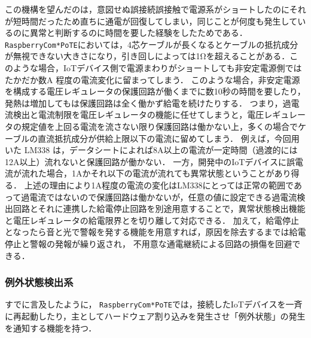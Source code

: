 この機構を望んだのは，意図せぬ誤接続誤接触で電源系がショートしたのにそれが短時間だったため直ちに通電が回復してしまい，同じことが何度も発生しているのに異常と判断するのに時間を要した経験をしたためである．
{\tt Raspberry\-Com*PoTE}においては，4芯ケーブルが長くなるとケーブルの抵抗成分が無視できない大きさになり，引き回しによっては1Ωを超えることがある．このような場合，IoTデバイス側で電源まわりがショートしても非安定電源側ではたかだか数A
程度の電流変化に留まってしまう．
このような場合，非安定電源を構成する電圧レギュレータの保護回路が働くまでに数10秒の時間を要したり，発熱は増加してもは保護回路は全く働かず給電を続けたりする．
つまり，過電流検出と電流制限を電圧レギュレータの機能に任せてしまうと，電圧レギュレータの規定値を上回る電流を流さない限り保護回路は働かない上，多くの場合でケーブルの直流抵抗成分が供給上限以下の電流に留めてしまう．
例えば，今回用いた LM338 は，データシートによれば8A以上の電流が一定時間（過渡的には12A以上）流れないと保護回路が働かない．
一方，開発中のIoTデバイスに誤電流が流れた場合，1Aかそれ以下の電流が流れても異常状態ということがあり得る．
上述の理由により1A程度の電流の変化はLM338にとっては正常の範囲であって過電流ではないので保護回路は働かないが，任意の値に設定できる過電流検出回路とそれに連携した給電停止回路を別途用意することで，異常状態検出機能と電圧レギュレータの給電限界とを切り離して対応できる．
加えて，給電停止となったら音と光で警報を発する機能を用意すれば，原因を除去するまでは給電停止と警報の発報が繰り返され，
不用意な通電継続による回路の損傷を回避できる．




\subsubsection{例外状態検出系}


すでに言及したように，
{\tt Raspberry\-Com*PoTE}では，接続したIoTデバイスを一斉に再起動したり，主としてハードウェア割り込みを発生させ「例外状態」の発生を通知する機能を持つ．

